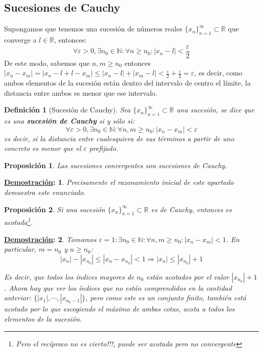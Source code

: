 \documentclass[10pt,a4paper,openright]{book}
\theoremstyle{break}
\newtheorem*{defi}{Definición}
\newtheorem*{prop}{Proposición}
\newtheorem*{demo}{\underline{Demostración}:}
\begin{document}
\subsection{Sucesiones de Cauchy}
Supongamos que tenemos una sucesión de números reales $\{x_n\}_{n=1}^\infty\subset \mathbb R$ que converge a $l\in \mathbb R$, entonces:
$$\forall \varepsilon>0, \exists n_0\in \mathbb N: \forall n\geq n_0: |x_n-l|<\frac{\varepsilon}{2}$$
De este modo, sabemos que $n,m\geq n_0$ entonces $|x_n-x_m|=|x_n-l+l-x_m|\leq |x_n-l|+|x_m-l|< \frac{\varepsilon}{2}+\frac{\varepsilon}{2}=\varepsilon$, es decir, como ambos elementos de la sucesión están dentro del intervalo de centro el límite, la distancia entre ambos es menor que ese intervalo.

\begin{defi}[Sucesión de Cauchy]
Sea $\{x_n\}_{n=1}^\infty\subset \mathbb R$ una sucesión, se dice que es una \textbf{sucesión de Cauchy} si y sólo si:
$$\forall \varepsilon>0, \exists n_0\in \mathbb N: \forall n,m\geq n_0: |x_n-x_m|<\varepsilon$$
es decir, si la distancia entre cualesquiera de sus términos a partir de uno concreto es menor que el $\varepsilon$ prefijado.
\end{defi}

\begin{prop}
Las sucesiones convergentes son sucesiones de Cauchy.
\end{prop}

\begin{demo}
Precisamente el razonamiento inicial de este apartado demuestra este enunciado.
\end{demo}

\begin{prop}
Si una sucesión $\{x_n\}_{n=1}^\infty\subset \mathbb R$ es de Cauchy, entonces es acotada\footnote{Pero el recíproco no es cierto!!!, puede ser acotada pero no convergente}.\par
\end{prop}
\begin{demo}
Tomamos $\varepsilon=1: \exists n_0\in \mathbb N: \forall n,m\geq n_0: |x_n-x_m|<1$. En particular, $m=n_0$ y $n\geq n_0$:
$$|x_n|-|x_{n_0}|\leq |x_n-x_{n_0}|<1\Rightarrow |x_n|\leq |x_{n_0}|+1$$

Es decir, que todos los índices mayores de $n_0$ están acotados por el valor $|x_{n_0}|+1$. Ahora hay que ver los índices que no están comprendidos en la cantidad anterior: $\{|x_1|, \cdots, |x_{n_0-1}|\}$, pero como este es un conjunto finito, también está acotado por lo que escogiendo el máximo de ambas cotas, acota a todos los elementos de la sucesión.
\end{demo}
\end{document}
